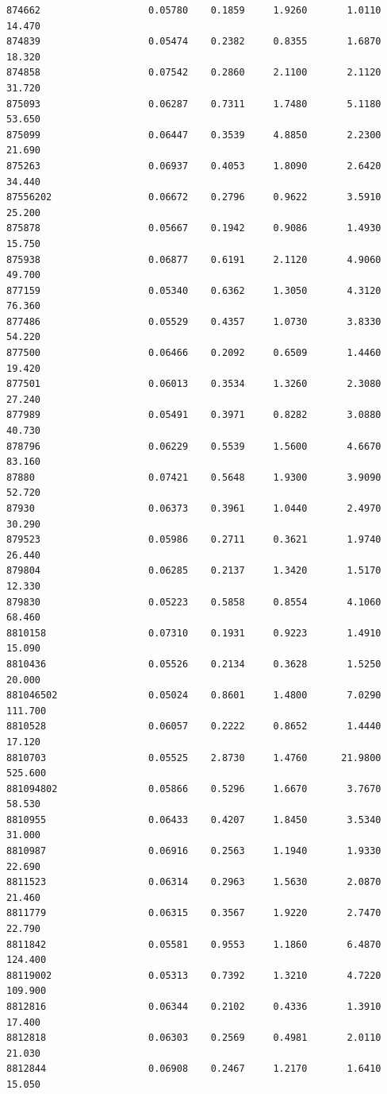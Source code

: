 \documentclass[
  letterpaper,
  DIV=11,
  numbers=noendperiod]{scrartcl}
\begin{document}
\begin{verbatim}
874662                   0.05780    0.1859     1.9260       1.0110  14.470
874839                   0.05474    0.2382     0.8355       1.6870  18.320
874858                   0.07542    0.2860     2.1100       2.1120  31.720
875093                   0.06287    0.7311     1.7480       5.1180  53.650
875099                   0.06447    0.3539     4.8850       2.2300  21.690
875263                   0.06937    0.4053     1.8090       2.6420  34.440
87556202                 0.06672    0.2796     0.9622       3.5910  25.200
875878                   0.05667    0.1942     0.9086       1.4930  15.750
875938                   0.06877    0.6191     2.1120       4.9060  49.700
877159                   0.05340    0.6362     1.3050       4.3120  76.360
877486                   0.05529    0.4357     1.0730       3.8330  54.220
877500                   0.06466    0.2092     0.6509       1.4460  19.420
877501                   0.06013    0.3534     1.3260       2.3080  27.240
877989                   0.05491    0.3971     0.8282       3.0880  40.730
878796                   0.06229    0.5539     1.5600       4.6670  83.160
87880                    0.07421    0.5648     1.9300       3.9090  52.720
87930                    0.06373    0.3961     1.0440       2.4970  30.290
879523                   0.05986    0.2711     0.3621       1.9740  26.440
879804                   0.06285    0.2137     1.3420       1.5170  12.330
879830                   0.05223    0.5858     0.8554       4.1060  68.460
8810158                  0.07310    0.1931     0.9223       1.4910  15.090
8810436                  0.05526    0.2134     0.3628       1.5250  20.000
881046502                0.05024    0.8601     1.4800       7.0290 111.700
8810528                  0.06057    0.2222     0.8652       1.4440  17.120
8810703                  0.05525    2.8730     1.4760      21.9800 525.600
881094802                0.05866    0.5296     1.6670       3.7670  58.530
8810955                  0.06433    0.4207     1.8450       3.5340  31.000
8810987                  0.06916    0.2563     1.1940       1.9330  22.690
8811523                  0.06314    0.2963     1.5630       2.0870  21.460
8811779                  0.06315    0.3567     1.9220       2.7470  22.790
8811842                  0.05581    0.9553     1.1860       6.4870 124.400
88119002                 0.05313    0.7392     1.3210       4.7220 109.900
8812816                  0.06344    0.2102     0.4336       1.3910  17.400
8812818                  0.06303    0.2569     0.4981       2.0110  21.030
8812844                  0.06908    0.2467     1.2170       1.6410  15.050

\end{verbatim}
\end{document}
